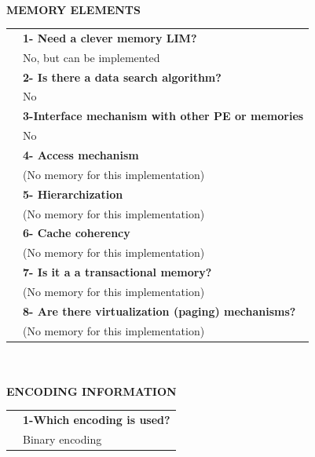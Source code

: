 \newpage{\large \textbf{\qquad }}\vspace{10pt}\\
{\large \textbf{MEMORY ELEMENTS}}\vspace{10pt}\\\begin{tabular}{ p{0.2cm} p{14.5cm}}
	&\textbf{1- Need a clever memory LIM?}\\
	&	No, but can be implemented\vspace{7pt}\\
	&\textbf{2- Is there a data search algorithm?}\\
	&	No\vspace{7pt}\\
	&\textbf{	3-Interface mechanism with other PE or memories}\\
	&	No\vspace{7pt}\\
	&	\textbf{4- Access mechanism}\\
	&	(No memory for this implementation)\vspace{7pt}\\
	&	\textbf{5- Hierarchization} \\
	&	(No memory for this implementation)\vspace{7pt}\\
	&\textbf{	6- Cache coherency} \\
	&	(No memory for this implementation)\vspace{7pt}\\
	&\textbf{	7- Is it a a transactional memory?}\\
	&	(No memory for this implementation)\vspace{7pt}\\
	&\textbf{	8- Are there virtualization (paging) mechanisms?}\\
	&	(No memory for this implementation)\end{tabular}\vspace{14pt}\\
\vspace{10pt}\\
{\large\textbf{ENCODING INFORMATION}}\vspace{10pt}\\
\begin{tabular}{ p{0.2cm} p{14.5cm}}
	&\textbf{1-Which encoding is used?}\\
	&Binary encoding
\end{tabular}
\newpage{\large\textbf{ }}\vspace{10pt}\\

